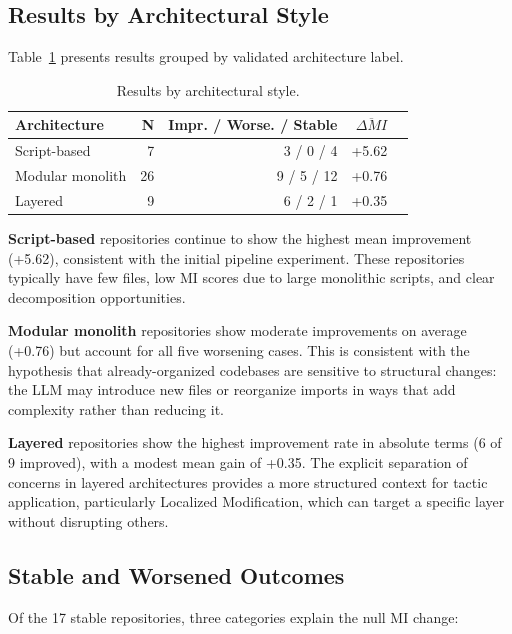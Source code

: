 \documentclass[sigconf,review,anonymous]{acmart}
\begin{document}
\subsection{Results by Architectural Style}

Table~\ref{tab:exp5_arch} presents results grouped by validated architecture label.

\begin{table}[H]
\centering
\small
\caption{Results by architectural style.}
\label{tab:exp5_arch}
\begin{tabular}{lrrrr}
\toprule
\textbf{Architecture} & \textbf{N} & \textbf{Impr. / Worse. / Stable} & $\overline{\Delta MI}$ \\
\midrule
Script-based     & 7  & 3 / 0 / 4 & +5.62 \\
Modular monolith & 26 & 9 / 5 / 12 & +0.76 \\
Layered          & 9  & 6 / 2 / 1 & +0.35 \\
\bottomrule
\end{tabular}
\end{table}

\textbf{Script-based} repositories continue to show the highest mean improvement (+5.62), consistent with the initial pipeline experiment. These repositories typically have few files, low MI scores due to large monolithic scripts, and clear decomposition opportunities.

\textbf{Modular monolith} repositories show moderate improvements on average (+0.76) but account for all five worsening cases. This is consistent with the hypothesis that already-organized codebases are sensitive to structural changes: the LLM may introduce new files or reorganize imports in ways that add complexity rather than reducing it.

\textbf{Layered} repositories show the highest improvement rate in absolute terms (6 of 9 improved), with a modest mean gain of +0.35. The explicit separation of concerns in layered architectures provides a more structured context for tactic application, particularly Localized Modification, which can target a specific layer without disrupting others.

\subsection{Stable and Worsened Outcomes}

Of the 17 stable repositories, three categories explain the null MI change:
\end{document}
